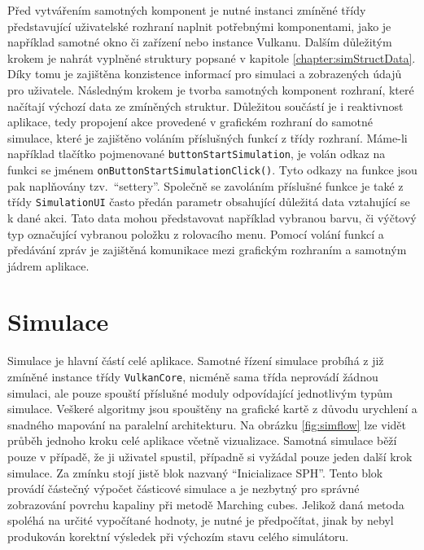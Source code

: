 Před vytvářením samotných komponent je nutné instanci zmíněné třídy představující uživatelské rozhraní naplnit potřebnými komponentami, jako je například samotné okno či zařízení nebo instance Vulkanu. Dalším důležitým krokem je nahrát vyplněné struktury popsané v kapitole \ref{chapter:simStructData}. Díky tomu je zajištěna konzistence informací pro simulaci a zobrazených údajů pro uživatele. Následným krokem je tvorba samotných komponent rozhraní, které načítají výchozí data ze zmíněných struktur. Důležitou součástí je i reaktivnost aplikace, tedy propojení akce provedené v grafickém rozhraní do samotné simulace, které je zajištěno voláním příslušných funkcí z třídy rozhraní. Máme-li například tlačítko pojmenované \texttt{buttonStartSimulation}, je volán odkaz na funkci se jménem \texttt{onButtonStartSimulationClick()}. Tyto odkazy na funkce jsou pak naplňovány tzv.~\enquote{settery}. Společně se zavoláním příslušné funkce je také z třídy \texttt{SimulationUI} často předán parametr obsahující důležitá data vztahující se k dané akci. Tato data mohou představovat například vybranou barvu, či výčtový typ označující vybranou položku z rolovacího menu. Pomocí volání funkcí a předávání zpráv je zajištěná komunikace mezi grafickým rozhraním a samotným jádrem aplikace.

\section{Simulace}
\label{chapter:simulace}
Simulace je hlavní částí celé aplikace. Samotné řízení simulace probíhá z již zmíněné instance třídy \texttt{VulkanCore}, nicméně sama třída neprovádí žádnou simulaci, ale pouze spouští příslušné moduly odpovídající jednotlivým typům simulace. Veškeré algoritmy jsou spouštěny na grafické kartě z důvodu urychlení a snadného mapování na paralelní architekturu. Na obrázku \ref{fig:simflow} lze vidět průběh jednoho kroku celé aplikace včetně vizualizace. Samotná simulace běží pouze v případě, že ji uživatel spustil, případně si vyžádal pouze jeden další krok simulace. Za zmínku stojí jistě blok nazvaný \enquote{Inicializace SPH}. Tento blok provádí částečný výpočet částicové simulace a je nezbytný pro správné zobrazování povrchu kapaliny při metodě Marching cubes. Jelikož daná metoda spoléhá na určité vypočítané hodnoty, je nutné je předpočítat, jinak by nebyl produkován korektní výsledek při výchozím stavu celého simulátoru.

